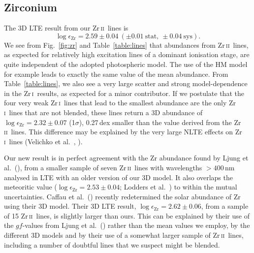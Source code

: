 \documentclass[traditabstract]{aa}
\newcommand{\altzri}{Zr\,\textsc{i}}
\newcommand{\altzrii}{Zr\,\textsc{ii}}
\newcommand{\zri}{\altzri\ }
\newcommand{\zrii}{\altzrii\ }
\begin{document}
\subsection{Zirconium}
\label{zrresults}
The 3D LTE result from our \zrii lines is 
\begin{displaymath}
\log\epsilon_{\mathrm{Zr}}=2.59\pm0.04\ (\pm0.01\ \mathrm{stat},\ \pm0.04\ \mathrm{sys}).
\end{displaymath}
We see from Fig.~\ref{fig:zr} and Table~\ref{table:lines} that abundances from \zrii lines, as expected for relatively high excitation lines of a dominant ionisation stage, are quite independent of the adopted photospheric model.  The use of the HM model for example leads to exactly the same value of the mean abundance.  From Table~\ref{table:lines}, we also see a very large scatter and strong model-dependence in the \zri results, as expected for a minor contributor.  If we postulate that the four very weak \zri lines that lead to the smallest abundance are the only \zri lines that are not blended, these lines return a 3D abundance of $\log\epsilon_{\mathrm{Zr}}=2.32\pm0.07$ (1$\sigma$), 0.27\,dex smaller than the value derived from the \zrii lines.  This difference may be explained by the very large NLTE effects on \zri lines (Velichko et al.\ \cite{veli}, \cite{veli2}).

Our new result is in perfect agreement with the Zr abundance found by Ljung et al.\ (\cite{ljung}), from a smaller sample of seven \zrii lines with wavelengths $>400$\,nm analysed in LTE with an older version of our 3D model.  It also overlaps the meteoritic value ($\log \epsilon_{\mathrm{Zr}}=2.53\pm0.04$; Lodders et al.\ \cite{lodd}) to within the mutual uncertainties.  Caffau et al.\ (\cite{caf1}) recently redetermined the solar abundance of Zr using their 3D model. Their 3D LTE result,
$\log\epsilon_{\mathrm{Zr}}=2.62\pm0.06$, from a sample of 15 \zrii lines, is slightly larger than ours. This can be explained by their use of the $gf$-values from Ljung et al.\ (\cite{ljung}) rather than the mean values we employ, by the different 3D models and by their use of a somewhat larger sample of \zrii lines, including a number of doubtful lines that we suspect might be blended.
\end{document}
